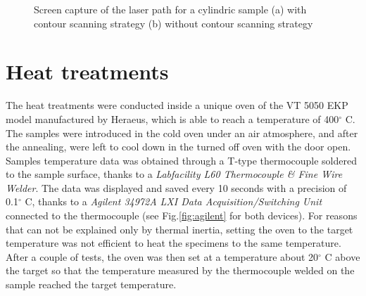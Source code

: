 \begin{figure}[ht]
\centering
\noindent{}
\decoRule
\caption[Screen capture of the laser path for a cylindric sample (a) with contour scanning strategy (b) without contour scanning strategy]{Screen capture of the laser path for a cylindric sample (a) with contour scanning strategy (b) without contour scanning strategy}
\label{fig:LasCSC}
\end{figure}

\section{Heat treatments}
\label{MMHT}
The heat treatments were conducted inside a unique oven of the VT 5050 EKP model manufactured by Heraeus, which is able to reach a temperature of 400$^\circ$ C. The samples were introduced in the cold oven under an air atmosphere, and after the annealing, were left to cool down in the turned off oven with the door open. Samples temperature data was obtained through a T-type thermocouple soldered to the sample surface, thanks to a \textit{Labfacility L60 Thermocouple \& Fine Wire Welder}. The data was displayed and saved every 10 seconds with a precision of 0.1$^\circ$ C, thanks to a \textit{Agilent 34972A LXI Data Acquisition/Switching Unit} connected to the thermocouple (see Fig.\ref{fig:agilent} for both devices). For reasons that can not be explained only by thermal inertia, setting the oven to the target temperature was not efficient to heat the specimens to the same temperature. After a couple of tests, the oven was then set at a temperature about 20$^\circ$ C above the target so that the temperature measured by the thermocouple welded on the sample reached the target temperature.\\

